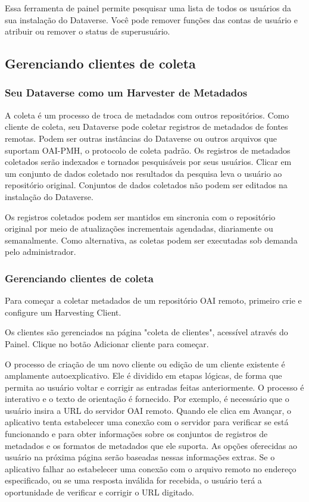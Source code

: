 \documentclass[12pt,hidelinks]{article}
\begin{document}
\qquad Essa ferramenta de painel permite pesquisar uma lista de todos os usuários da sua instalação do Dataverse. Você pode remover funções das contas de usuário e atribuir ou remover o status de superusuário.

\subsection{Gerenciando clientes de coleta}

\subsubsection{Seu Dataverse como um Harvester de Metadados}

\qquad A coleta é um processo de troca de metadados com outros repositórios. Como cliente de coleta, seu Dataverse pode coletar registros de metadados de fontes remotas. Podem ser outras instâncias do Dataverse ou outros arquivos que suportam OAI-PMH, o protocolo de coleta padrão. Os registros de metadados coletados serão indexados e tornados pesquisáveis por seus usuários. Clicar em um conjunto de dados coletado nos resultados da pesquisa leva o usuário ao repositório original. Conjuntos de dados coletados não podem ser editados na instalação do Dataverse.
 
Os registros coletados podem ser mantidos em sincronia com o repositório original por meio de atualizações incrementais agendadas, diariamente ou semanalmente. Como alternativa, as coletas podem ser executadas sob demanda pelo administrador.
 
\subsubsection{Gerenciando clientes de coleta}

\qquad Para começar a coletar metadados de um repositório OAI remoto, primeiro crie e configure um Harvesting Client.
 
Os clientes são gerenciados na página "coleta de clientes", acessível através do Painel. Clique no botão Adicionar cliente para começar.
 
O processo de criação de um novo cliente ou edição de um cliente existente é amplamente autoexplicativo. Ele é dividido em etapas lógicas, de forma que permita ao usuário voltar e corrigir as entradas feitas anteriormente. O processo é interativo e o texto de orientação é fornecido. Por exemplo, é necessário que o usuário insira a URL do servidor OAI remoto. Quando ele clica em Avançar, o aplicativo tenta estabelecer uma conexão com o servidor para verificar se está funcionando e para obter informações sobre os conjuntos de registros de metadados e os formatos de metadados que ele suporta. As opções oferecidas ao usuário na próxima página serão baseadas nessas informações extras. Se o aplicativo falhar ao estabelecer uma conexão com o arquivo remoto no endereço especificado, ou se uma resposta inválida for recebida, o usuário terá a oportunidade de verificar e corrigir o URL digitado.
 
\end{document}
